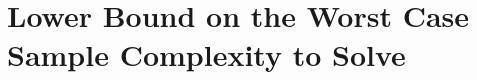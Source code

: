 \section{ Lower Bound on the Worst Case Sample Complexity to Solve \QFK}
 \label{app:lowerboundqfk}
 
 
 
